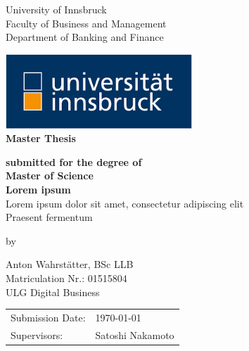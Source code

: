\documentclass[12pt]{article}
\begin{document}
\begin{center}
	\thispagestyle{empty}
	\LARGE{University of Innsbruck}\\[-0.9ex]
	\LARGE{Faculty of Business and Management}\\[2ex]
	\large{Department of Banking and Finance}\\
	\vspace{0.3cm}
\begin{center}
\includegraphics[width=7cm]{university innsbruck logo.png} \\
\vspace{0.9cm}
\textbf{\LARGE{Master Thesis}}
\medskip\par
\textbf{\normalsize{submitted for the degree of}} \\[2ex]
\textbf{\Large{Master of Science}}\\
\vspace{1.2cm}
\Large{\textbf{Lorem ipsum}}\\[-0.5ex]
\large{Lorem ipsum dolor sit amet, consectetur adipiscing elit}\\[-1.5ex]
\large{Praesent fermentum}
\bigskip\par
by \par
\large{Anton Wahrstätter, BSc LLB }\\[-1ex]
\large{Matriculation Nr.: 01515804}\\ [-1ex]
\large{ULG Digital Business}\\[-1ex]
\vspace{0.6cm}
\end{center}
\medskip
\end{center}
\begin{tabular}{ll}
  Submission Date:  & \today \\[-1ex]
  Supervisors: & Satoshi Nakamoto \\
\end{tabular}
\end{document}
